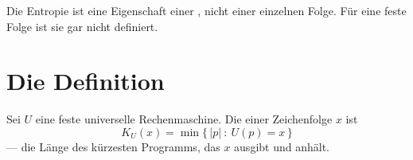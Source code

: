 \begin{merksatz}
Die Entropie ist eine Eigenschaft einer , nicht einer einzelnen Folge. Für eine feste Folge ist sie gar nicht definiert.

\begin{center}
\begin{minipage}{0.88\textwidth}
\end{minipage}
\end{center}
\end{merksatz}

\section{Die Definition}

\begin{definition}
Sei $U$ eine feste universelle Rechenmaschine. Die  einer Zeichenfolge $x$ ist
\[ K_U(x) = \min\bigl\{\,|p| \ : \ U(p) = x\,\bigr\} \]
--- die Länge des kürzesten Programms, das $x$ ausgibt und anhält.
\end{definition}

